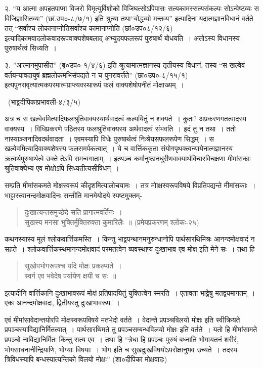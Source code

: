 {२. “य आत्मा अपहतपाप्मा विजरो विमृत्युर्विशोको विजिघत्सोऽपिपासः सत्यकामस्सत्यसंकल्पः सोऽन्वेष्टव्यः स विजिज्ञासितव्यः” (छां.उप०-८/७/१) इति श्रुत्या तथा\break “बोद्धव्यो मन्तव्य” इत्यादिना यदात्मज्ञानविधानं वर्तते तत् “सर्वांश्च लोकानाप्नोति\break सर्वांश्च कामानाप्नोति (छां०उप०८/१२/६) इत्यादिकामवादलोकवादरूपवाक्यशेषबलाद् अभ्युदयफलरूपं पुरुषार्थं बोधयति~। अतोऽस्य विधानस्य पुरुषार्थत्वं सिध्यति~। 

३. ”आत्मानमुपासीत” (बृ०उप०-१/४/६) इति श्रुत्यामात्मज्ञानस्य तृतीयस्य विधानं, तस्य “स खल्वेवं वर्तयन्यावदायुषं ब्रह्मलोकमभिसंपद्यते न च पुनरावर्त्तते” (छा०उप०-८/१५/१) इत्यपुनरावृत्यात्मकपरमात्मप्राप्त्यवस्थारूपं फलं वाक्यशेषोपनीतं मोक्षाख्यम्~। 

~\hfill (भाट्टदीपिकाप्रभावली-४/३/५) 

अत्र च स खल्वेवमित्यादिफलश्रुतिवाक्यस्यार्थवादत्वं कल्पयितुं न शक्यते~। कुतः? अप्रकरणगतत्वादस्य वाक्यस्य~। विधिप्रकरणे पठितस्य फलश्रुतिवाक्यस्य अर्थवादत्वं संभवति~। इदं तु न तथा~। ततो नास्याञ्जनादिवदर्थवादता~। एवमस्यापि विधेः पुरुषार्थत्वं निःश्रेयसफलरूपेण सिद्धम्~। स खल्वेवमित्यादिवाक्यशेषस्य फलसमर्पकत्वात्~। ये च वार्त्तिककृता संयोगपृथक्त्वन्यायेनात्मज्ञानस्य क्रत्वर्थपुरुषार्थत्वे उक्ते तेऽपि समन्वगाताम्~। इत्थञ्च कर्मानुष्ठानधुरीणवाक्यार्थविचारविचक्षणा मीमांसकाः श्रुतिवाक्येभ्य एव मोक्षोऽपि सिध्यतीत्यसीषिधन्~। 

सम्प्रति मीमांसकमते मोक्षस्वरूपं कीदृशमित्यालोचयामः~। तत्र मोाक्षस्वरूपविषये विप्रतिपद्यन्ते मीमांसकाः~। भाट्टास्त्वानन्दमोक्षवादिनः सन्तीति मानमेयोदये स्पष्टमुक्तम्-
\begin{verse}
दुःखात्यन्तसमुच्छेदे सति प्रागात्मवर्तिनः~। \\
सुखस्य मनसा भुक्तिर्मुक्तिरुक्ता कुमारिलैः~॥ (प्रमेयप्रकरणम् श्लोकः-२५)
\end{verse}
कथनस्यास्य मूलं श्लोकवार्त्तिकमस्ति~। किन्तु भाट्टपन्थानमनुरुन्धानोपि पार्थसारथिमिश्रः आनन्दमोक्षवादं न सहते~। श्लोकवार्त्तिकस्थमानन्दमोक्षवादं परमतत्वेन व्यवस्थाप्य दुःखाभाव एव मोक्ष इति मेने सः~। तथा हि
\begin{verse}
सुखोपभोगरूपश्च यदि मोक्षः प्रकल्प्यते~। \\
स्वर्ग एव भवेदेष पर्यायेण क्षयी च सः~॥ 
\end{verse}
इत्यादीनि वार्त्तिकानि दुःखाभावरूपं मोक्षं प्रतिपादयितुं युक्तित्वेन स्मरति~। एतावता भाट्टेषु मतद्वयमागतम्~। एकः आनन्दमोक्षवादः, द्वितीयस्तु दुःखाभावरूपः~। 

एवं मीमांसावेदान्तयोरपि मोक्षस्वरूपविषये मतभेदो वर्तते~। वेदान्ते प्रपञ्चविलयो मोक्षः इति स्वीक्रियते प्रपञ्चस्याविद्यानिर्मितत्वात्~। पार्थसारथिमते तु प्रपञ्चसम्बन्धविलयो मोक्षः इति वर्तते~। यतो हि मीमांसामते प्रपञ्चो नाविद्यानिर्मितः किन्तु सत्य एव~। तथा हि  “त्रेधा हि प्रपञ्चः पुरुषं बध्नाति भोगायतनं  शरीरं, भोगसाधनानीन्द्रियाणि, भोग्याः विषयाः~। भोग इति च सुखदुःखविषयोऽपरोक्षानुभव उच्यते~। तदस्य त्रिविधस्यापि बन्धस्यात्यन्तिको विलयो मोक्षः” (शा०दीपिका मोक्षवादः)

}
